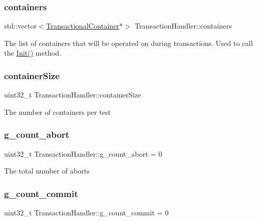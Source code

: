 \subsubsection{\texorpdfstring{containers}{containers}}
{\footnotesize\ttfamily std\+::vector$<$\hyperlink{classTransactionalContainer}{Transactional\+Container}$\ast$$>$ Transaction\+Handler\+::containers}

The list of containers that will be operated on during transactions. Used to call the \hyperlink{classTransactionHandler_a9f45dc37682c5bee0f80785c0e79ce01}{Init()} method. \mbox{\label{classTransactionHandler_a97ca9af5f1ca5765520a73e5cd2fb554}} 
\subsubsection{\texorpdfstring{container\+Size}{containerSize}}
{\footnotesize\ttfamily uint32\+\_\+t Transaction\+Handler\+::container\+Size}

The number of containers per test \mbox{\label{classTransactionHandler_af87828161891a98e9910c937407876ab}} 
\subsubsection{\texorpdfstring{g\+\_\+count\+\_\+abort}{g\_count\_abort}}
{\footnotesize\ttfamily uint32\+\_\+t Transaction\+Handler\+::g\+\_\+count\+\_\+abort = 0}

The total number of aborts \mbox{\label{classTransactionHandler_aa0e3e84eac8fe9ee92c41ab61014fd3d}} 
\subsubsection{\texorpdfstring{g\+\_\+count\+\_\+commit}{g\_count\_commit}}
{\footnotesize\ttfamily uint32\+\_\+t Transaction\+Handler\+::g\+\_\+count\+\_\+commit = 0}


